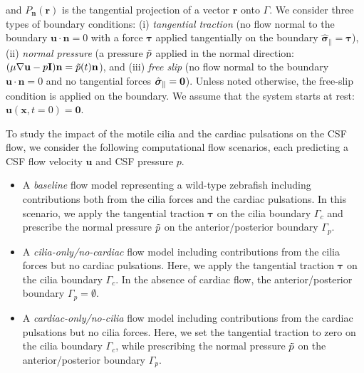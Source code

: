 \documentclass[fleqn]{wlscirep}
\newcommand{\Gc}{\Gamma_{c}}
\newcommand{\Gp}{\Gamma_{p}}
\newcommand{\nn}{\mathbf{n}}
\newcommand{\rr}{\mathbf{r}}
\newcommand{\uu}{\mathbf{u}}
\newcommand{\xx}{\bm{x}}
\newcommand{\bsig}{\bm{\sigma}}
\newcommand{\bsigpar}{\hat{\bsig}_{\parallel}}
\newcommand{\btau}{\bm{\tau}}
\begin{document}
and $P_{\nn}(\rr)$ is the tangential projection of a vector $\rr$ onto $\Gamma$.
We consider three types of boundary conditions:
(i) \emph{tangential traction} (no flow normal to the boundary
$\uu \cdot \nn = 0$ with a force $\btau$ applied tangentially on the boundary $\bsigpar = \btau$),
(ii) \emph{normal pressure} (a pressure $\Tilde{p}$ applied in
the normal direction: $(\mu\nabla\uu - p\mathbf{I})\nn = \Tilde{p}(t)\nn$),
and (iii) \emph{free slip} (no flow normal to the boundary
$\uu \cdot \nn = 0$ and no tangential forces $\bsigpar = {\bf 0}$).
Unless noted otherwise, the free-slip condition is applied on the
boundary. We assume that the system starts at rest: $\uu(\xx, t=0) = \mathbf{0}$.

To study the impact of the motile cilia and the cardiac pulsations on the CSF flow,
we consider the following computational flow scenarios,
each predicting a CSF flow velocity $\uu$ and CSF pressure $p$.
\begin{itemize}
    \item A \emph{baseline} flow model representing a wild-type zebrafish including 
    contributions both from the cilia forces and the cardiac pulsations.
    In this scenario, we apply the tangential traction $\btau$ on the cilia boundary
    $\Gc$ and prescribe the normal pressure $\Tilde{p}$ on the anterior/posterior boundary $\Gp$. %

    \item A \emph{cilia-only/no-cardiac} flow model including contributions from the
    cilia forces but no cardiac pulsations.
    Here, we apply the tangential traction $\btau$ on the cilia boundary $\Gc$.
    In the absence of cardiac flow, the anterior/posterior boundary $\Gp=\emptyset$. %

    \item A \emph{cardiac-only/no-cilia} flow model including contributions from the
    cardiac pulsations but no cilia forces.
    Here, we set the tangential traction to zero on the cilia boundary
    $\Gc$, while prescribing the normal pressure $\Tilde{p}$ on the
    anterior/posterior boundary $\Gp$.  %
\end{itemize}
\end{document}
